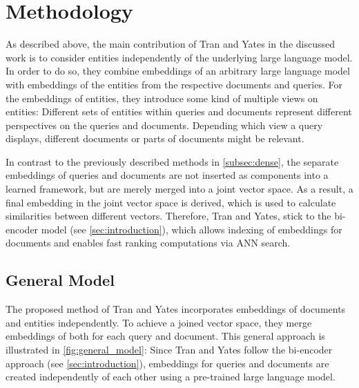 \section{Methodology}\label{sec:methods}

As described above, the main contribution of Tran and Yates in the discussed work is to consider entities independently of the underlying large language model. In order to do so, they combine embeddings of an arbitrary large language model with embeddings of the entities from the respective documents and queries. For the embeddings of entities, they introduce some kind of multiple views on entities: Different sets of entities within queries and documents represent different perspectives on the queries and documents. Depending which view a query displays, different documents or parts of documents might be relevant.

In contrast to the previously described methods in \autoref{subsec:dense}, the separate embeddings of queries and documents are not inserted as components into a learned framework, but are merely merged into a joint vector space. As a result, a final embedding in the joint vector space is derived, which is used to calculate similarities between different vectors. Therefore, Tran and Yates, stick to the bi-encoder model (see \autoref{sec:introduction}), which allows indexing of embeddings for documents and enables fast ranking computations via ANN search. 

\subsection{General Model}\label{subsec:general_model}

The proposed method of Tran and Yates incorporates embeddings of documents and entities independently. To achieve a joined vector space, they merge embeddings of both for each query and document. This general approach is illustrated in \autoref{fig:general_model}: Since Tran and Yates follow the bi-encoder approach (see \autoref{sec:introduction}), embeddings for queries and documents are created independently of each other using a pre-trained large language model. 

